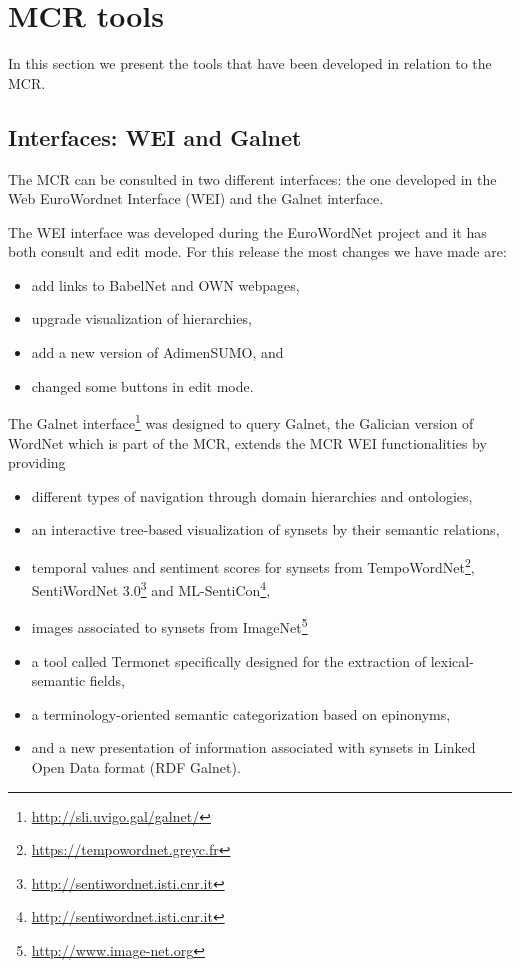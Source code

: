 \documentclass[runningheads]{llncs}
\begin{document}
\section{MCR tools} %
In this section we present the tools that have been developed in relation to the MCR.

\subsection{Interfaces: WEI and Galnet}

The MCR can be consulted in two different interfaces: the one developed in the Web EuroWordnet Interface (WEI) and the Galnet interface.

The WEI interface was developed during the EuroWordNet project and it has both  consult and edit mode. For this release the most changes we have made  are:
\begin{itemize}
\item add links to BabelNet and OWN webpages,   
\item upgrade  visualization  of  hierarchies,
\item  add a new version of AdimenSUMO, and
\item changed some buttons in edit mode.
\end{itemize}


The Galnet interface\footnote{\url{http://sli.uvigo.gal/galnet/}} was  designed to query Galnet, the Galician version of WordNet which is part of the MCR, extends the MCR WEI functionalities by providing
\begin{itemize}
\item different types of navigation through domain hierarchies and ontologies,
\item an interactive tree-based visualization of synsets by their semantic relations,
\item temporal values and sentiment scores for synsets from TempoWordNet\footnote{\url{https://tempowordnet.greyc.fr}}, SentiWordNet 3.0\footnote{\url{http://sentiwordnet.isti.cnr.it}} and ML-SentiCon\footnote{\url{http://sentiwordnet.isti.cnr.it}},
\item images associated to synsets from ImageNet\footnote{\url{http://www.image-net.org}}
\item a tool called Termonet specifically designed for the extraction of lexical-semantic fields,
\item a terminology-oriented semantic categorization based on epinonyms,
\item and a new presentation of information associated with synsets in Linked Open Data format (RDF Galnet).
\end{itemize}
\end{document}
